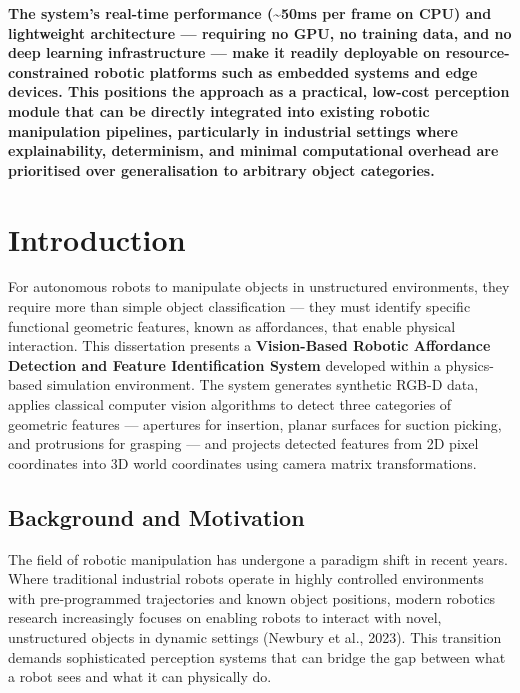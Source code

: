 \documentclass[11pt,a4paper]{article}
\begin{document}
\textbf{The system's real-time performance (\textasciitilde50ms per frame on CPU) and lightweight architecture --- requiring no GPU, no training data, and no deep learning infrastructure --- make it readily deployable on resource-constrained robotic platforms such as embedded systems and edge devices. This positions the approach as a practical, low-cost perception module that can be directly integrated into existing robotic manipulation pipelines, particularly in industrial settings where explainability, determinism, and minimal computational overhead are prioritised over generalisation to arbitrary object categories.}

\newpage

\section{Introduction}

For autonomous robots to manipulate objects in unstructured environments, they require more than simple object classification --- they must identify specific functional geometric features, known as affordances, that enable physical interaction. This dissertation presents a \textbf{Vision-Based Robotic Affordance Detection and Feature Identification System} developed within a physics-based simulation environment. The system generates synthetic RGB-D data, applies classical computer vision algorithms to detect three categories of geometric features --- apertures for insertion, planar surfaces for suction picking, and protrusions for grasping --- and projects detected features from 2D pixel coordinates into 3D world coordinates using camera matrix transformations.

\subsection{Background and Motivation}

The field of robotic manipulation has undergone a paradigm shift in recent years. Where traditional industrial robots operate in highly controlled environments with pre-programmed trajectories and known object positions, modern robotics research increasingly focuses on enabling robots to interact with novel, unstructured objects in dynamic settings (Newbury et al., 2023). This transition demands sophisticated perception systems that can bridge the gap between what a robot sees and what it can physically do.
\end{document}

